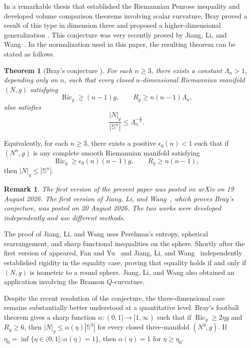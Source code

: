 \documentclass[11pt, reqno]{amsart}
\newtheorem{theorem}{Theorem}
\newtheorem{remark}{Remark}
\begin{document}
In a remarkable thesis that established the Riemannian Penrose inequality and developed volume comparison theorems involving scalar curvature, Bray proved a result of this type in dimension three and proposed a higher-dimensional generalization \cite[Conjecture~4]{Bray}. This conjecture was very recently proved by Jiang, Li, and Wang~\cite{JiangLiWang}. In the normalization used in this paper, the resulting theorem can be stated as follows.

\begin{theorem}[Bray's conjecture \cite{Bray, JiangLiWang}]\label{thm:Bray conjecture}
For each $n\ge 3$, there exists a constant $\Lambda_n>1$, depending only on $n$, such that every closed $n$-dimensional Riemannian manifold $(N, g)$ satisfying
$$
\operatorname{Ric}_g\ge (n-1)g,
\qquad
R_g\ge n(n-1)\Lambda_n,
$$
also satisfies
\begin{equation}\label{eq:bray-scaled}
\frac{|N|_g}{|\mathbb S^n|} \le \Lambda_n^{-\frac n2}.
\end{equation}
\end{theorem}

Equivalently, for each $n \ge 3$, there exists a positive $\epsilon_0(n)<1$ such that if $(N^n, g)$ is any complete smooth Riemannian manifold satisfying
$$
\operatorname{Ric}_g \ge \epsilon_0(n) (n-1)g,
\qquad
R_g \ge n(n-1),
$$
then $|N|_g\le |\mathbb S^n|$.
\medskip
\begin{remark}
\noindent
The first version of the present paper was posted on arXiv on 19 August 2026. The first version of Jiang, Li, and Wang~\cite{JiangLiWang}, which proves Bray's conjecture, was posted on 20 August 2026. The two works were developed independently and use different methods.
\end{remark}
The proof of Jiang, Li, and Wang uses Perelman's entropy, spherical rearrangement, and sharp functional inequalities on the sphere. Shortly after the first version of \cite{JiangLiWang} appeared, Fan and Yu~\cite{FanYu} and Jiang, Li, and Wang~\cite{JiangLiWang} independently established rigidity in the equality case, proving that equality holds if and only if $(N, g)$ is isometric to a round sphere. Jiang, Li, and Wang also obtained an application involving the Branson $Q$-curvature.

Despite the recent resolution of the conjecture, the three-dimensional case remains substantially better understood at a quantitative level. Bray's football theorem \cite[Theorem 19]{Bray} gives a sharp function $\alpha\colon(0, 1]\to[1, \infty)$ such that if $\operatorname{Ric}_g\ge 2\eta g$ and $R_g\ge 6$, then $|N|_g\le \alpha(\eta)|\mathbb S^3|$ for every closed three-manifold $(N^3, g)$. If $\eta_0=\inf\{\eta\in(0, 1]:\alpha(\eta)=1\}$, then $\alpha(\eta)=1$ for $\eta\ge \eta_0$.
\end{document}
